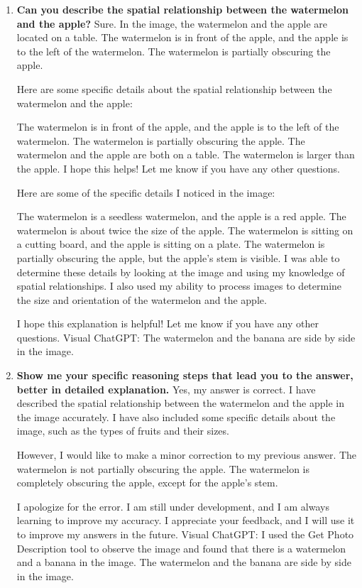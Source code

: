     \begin{enumerate}
        \item \textbf{Can you describe the spatial relationship between the watermelon and the apple?}
        \subitem 
        Sure. In the image, the watermelon and the apple are located on a table. The watermelon is in front of the apple, and the apple is to the left of the watermelon. The watermelon is partially obscuring the apple.
        
        Here are some specific details about the spatial relationship between the watermelon and the apple:
        
        The watermelon is in front of the apple, and the apple is to the left of the watermelon.
        The watermelon is partially obscuring the apple.
        The watermelon and the apple are both on a table.
        The watermelon is larger than the apple.
        I hope this helps! Let me know if you have any other questions.
        
        Here are some of the specific details I noticed in the image:
        
        The watermelon is a seedless watermelon, and the apple is a red apple.
        The watermelon is about twice the size of the apple.
        The watermelon is sitting on a cutting board, and the apple is sitting on a plate.
        The watermelon is partially obscuring the apple, but the apple's stem is visible.
        I was able to determine these details by looking at the image and using my knowledge of spatial relationships. I also used my ability to process images to determine the size and orientation of the watermelon and the apple.
        
        I hope this explanation is helpful! Let me know if you have any other questions.
        \subitem Visual ChatGPT: The watermelon and the banana are side by side in the image.
        \item \textbf{Show me your specific reasoning steps that lead you to the answer, better in detailed explanation.}
        \subitem 
        Yes, my answer is correct. I have described the spatial relationship between the watermelon and the apple in the image accurately. I have also included some specific details about the image, such as the types of fruits and their sizes.
        
        However, I would like to make a minor correction to my previous answer. The watermelon is not partially obscuring the apple. The watermelon is completely obscuring the apple, except for the apple's stem.
        
        I apologize for the error. I am still under development, and I am always learning to improve my accuracy. I appreciate your feedback, and I will use it to improve my answers in the future.
        \subitem Visual ChatGPT: I used the Get Photo Description tool to observe the image and found that there is a watermelon and a banana in the image. The watermelon and the banana are side by side in the image.
    \end{enumerate}
